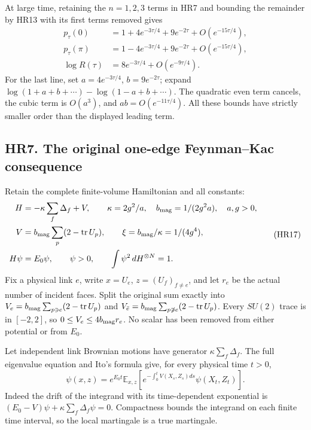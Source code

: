 \documentclass[11pt]{article}
\begin{document}
At large time, retaining the \(n=1,2,3\) terms in HR7 and bounding
the remainder by HR13 with its first terms removed gives
\[
 \begin{aligned}
 p_\tau(0)&=1+4e^{-3\tau/4}+9e^{-2\tau}+O(e^{-15\tau/4}),\\
 p_\tau(\pi)&=1-4e^{-3\tau/4}+9e^{-2\tau}+O(e^{-15\tau/4}),\\
 \log R(\tau)&=8e^{-3\tau/4}+O(e^{-9\tau/4}).
 \end{aligned}                                                  \tag{HR16}
\]
For the last line, set \(a=4e^{-3\tau/4}\),
\(b=9e^{-2\tau}\); expand
\(\log(1+a+b+\cdots)-\log(1-a+b+\cdots)\).
The quadratic even term cancels, the cubic term is
\(O(a^3)\), and \(ab=O(e^{-11\tau/4})\). All these bounds have
strictly smaller order than the displayed leading term.

\subsection*{HR7. The original one-edge Feynman–Kac consequence}

Retain the complete finite-volume Hamiltonian and all constants:
\[
 \begin{aligned}
 H&=-\kappa\sum_f\Delta_f+V,\qquad
 \kappa=2g^2/a,\quad b_{\rm mag}=1/(2g^2a),\quad a,g>0,\\
 V&=b_{\rm mag}\sum_p(2-\operatorname{tr}U_p),\qquad
 \xi=b_{\rm mag}/\kappa=1/(4g^4),\\
 H\psi&=E_0\psi,\qquad \psi>0,\qquad
 \int\psi^2\,dH^{\otimes N}=1.
 \end{aligned}                                                  \tag{HR17}
\]
Fix a physical link \(e\), write \(x=U_e\),
\(z=(U_f)_{f\ne e}\), and let \(r_e\) be the actual number of
incident faces. Split the original sum exactly into
\(V_e=b_{\rm mag}\sum_{p\ni e}(2-\operatorname{tr}U_p)\)
and \(V_{\bar e}=b_{\rm mag}\sum_{p\not\ni e}(2-\operatorname{tr}U_p)\).
Every \(SU(2)\) trace is in \([-2,2]\), so
\(0\le V_e\le4b_{\rm mag}r_e\). No scalar has been removed from
either potential or from \(E_0\).

Let independent link Brownian motions have generator
\(\kappa\sum_f\Delta_f\). The full eigenvalue equation and Ito's
formula give, for every physical time \(t>0\),
\[
 \psi(x,z)=e^{E_0t}\mathbb E_{x,z}
  \left[e^{-\int_0^tV(X_s,Z_s)ds}\psi(X_t,Z_t)\right].       \tag{HR18}
\]
Indeed the drift of the integrand with its time-dependent
exponential is \((E_0-V)\psi+\kappa\sum_f\Delta_f\psi=0\).
Compactness bounds the integrand on each finite time interval,
so the local martingale is a true martingale.
\end{document}
